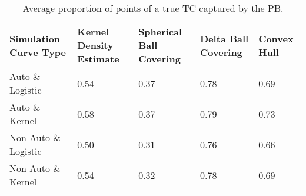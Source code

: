 \begin{table}[ht!]
\centering
\begin{tabular}{|R{1.2in}||L{.95in}L{.8in}|L{.75in}L{.75in}|}
  \hline
Simulation Curve Type & Kernel Density Estimate & Spherical Ball Covering & Delta Ball Covering & Convex Hull \\ 
  \hline
Auto \& Logistic & 0.54 & 0.37 & 0.78 & 0.69 \\ 
  Auto \& Kernel & 0.58 & 0.37 & 0.79 & 0.73 \\ 
  Non-Auto \& Logistic & 0.50 & 0.31 & 0.76 & 0.66 \\ 
  Non-Auto \& Kernel & 0.54 & 0.32 & 0.78 & 0.69 \\ 
   \hline
\end{tabular}
\caption{Average proportion of points of a true TC captured by the PB.} 
\label{tab:average_captured}
\end{table}
